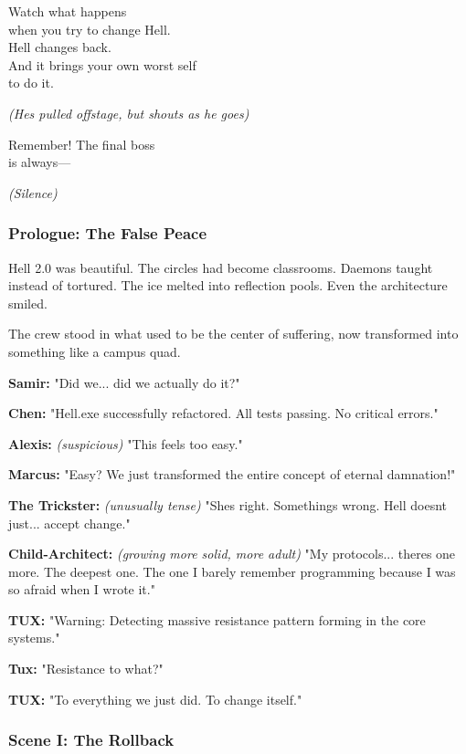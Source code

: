 Watch what happens\\
when you try to change Hell.\\
Hell changes back.\\
And it brings your own worst self\\
to do it.

\emph{(He\textquotesingle s pulled offstage, but shouts as he goes)}

Remember! The final boss\\
is always---

\emph{(Silence)}

\bookdivider

\subsubsection{Prologue: The False Peace}\label{prologue-the-false-peace}

Hell 2.0 was beautiful. The circles had become classrooms. Daemons taught instead of tortured. The ice melted into reflection pools. Even the architecture smiled.

The crew stood in what used to be the center of suffering, now transformed into something like a campus quad.

\textbf{Samir:} "Did we... did we actually do it?"

\textbf{Chen:} "Hell.exe successfully refactored. All tests passing. No critical errors."

\textbf{Alexis:} \emph{(suspicious)} "This feels too easy."

\textbf{Marcus:} "Easy? We just transformed the entire concept of eternal damnation!"

\textbf{The Trickster:} \emph{(unusually tense)} "She\textquotesingle s right. Something\textquotesingle s wrong. Hell doesn\textquotesingle t just... accept change."

\textbf{Child-Architect:} \emph{(growing more solid, more adult)} "My protocols... there\textquotesingle s one more. The deepest one. The one I barely remember programming because I was so afraid when I wrote it."

\textbf{TUX:} "Warning: Detecting massive resistance pattern forming in the core systems."

\textbf{Tux:} "Resistance to what?"

\textbf{TUX:} "To everything we just did. To change itself."

\bookdivider

\subsubsection{Scene I: The Rollback}\label{scene-i-the-rollback}

